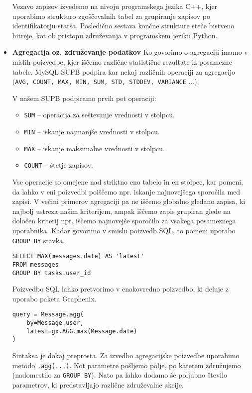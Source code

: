 \documentclass[a4paper,12pt,openright]{book}
\begin{document}
\begin{itemize}
        Vezavo zapisov izvedemo na nivoju programskega jezika C++, kjer uporabimo strukturo zgoščevalnih tabel za grupiranje zapisov po identifikatorju starša. Posledično sestava končne strukture steče bistveno hitreje, kot ob pristopu združevanja v programskem jeziku Python.

        \item \textbf{Agregacija oz. združevanje podatkov}
        \newline
        \noindent
        Ko govorimo o agregaciji imamo v mislih poizvedbe, kjer iščemo različne statistične rezultate iz posamezne tabele. MySQL SUPB podpira kar nekaj različnih operaciji za agregacijo \cite{MYSQL_AGG} ({\tt AVG, COUNT, MAX, MIN, SUM, STD, STDDEV, VARIANCE} ...).

        V našem SUPB podpiramo prvih pet operaciji:
        
        \begin{itemize}
            \item {\tt SUM} – operacija za seštevanje vrednosti v stolpcu.
            \item {\tt MIN} – iskanje najmanjše vrednosti v stolpcu.
            \item {\tt MAX} – iskanje maksimalne vrednosti v stolpcu.
            \item {\tt COUNT} – štetje zapisov.
        \end{itemize}

        Vse operacije so omejene nad striktno eno tabelo in en stolpec, kar pomeni, da lahko v eni poizvedbi poiščemo npr. iskanje najnovejšega sporočila med zapisi. V večini primerov agregaciji pa ne iščemo globalno gledano zapisa, ki najbolj ustreza našim kriterijem, ampak iščemo zapis grupiran glede na določen kriterij npr. iščemo najnovejše sporočilo za vsakega posameznega uporabnika. Kadar govorimo v smislu poizvedb SQL, to pomeni uporabo {\tt GROUP BY} stavka.

\begin{verbatim}
SELECT MAX(messages.date) AS 'latest' 
FROM messages
GROUP BY tasks.user_id
\end{verbatim}

        \noindent
        Poizvedbo SQL lahko pretvorimo v enakovredno poizvedbo, ki deluje z uporabo paketa Graphenix.

\begin{verbatim}
query = Message.agg(
    by=Message.user, 
    latest=gx.AGG.max(Message.date)
)
\end{verbatim}

        \noindent
        Sintaksa je dokaj preprosta. Za izvedbo agregacijske poizvedbe uporabimo metodo {\tt .agg(...)}. Kot parametre pošljemo polje, po katerem združujemo (nadomestilo za {\tt GROUP BY}). Nato pa lahko dodamo še poljubno število parametrov, ki predstavljajo različne združevalne akcije.
\end{itemize}
\end{document}
